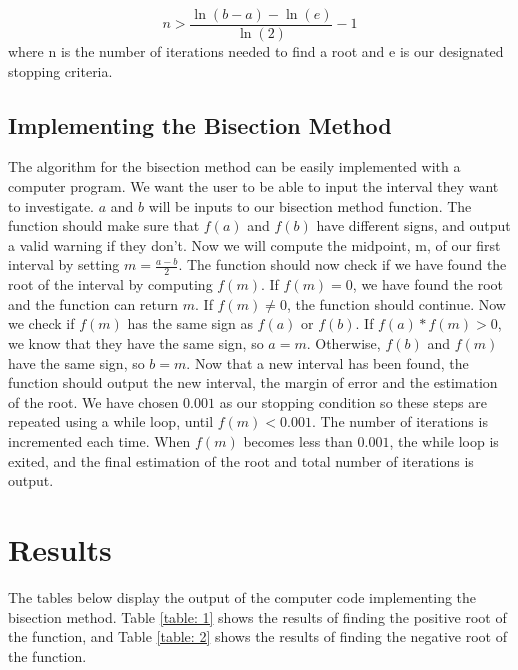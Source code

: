 \documentclass{article}
\begin{document}
\begin{equation*}
    n > \frac{\ln{(b-a)}-\ln{(e)}}{\ln{(2)}}-1
\end{equation*}
where n is the number of iterations needed to find a root and e is our designated stopping criteria.

\subsection{Implementing the Bisection Method} 
The algorithm for the bisection method can be easily implemented with a computer program. We want the user to be able to input the interval they want to investigate. $a$ and $b$ will be inputs to our bisection method function. The function should make sure that $f(a)$ and $f(b)$ have different signs, and output a valid warning if they don't. Now we will compute the midpoint, m, of our first interval by setting $m=\frac{a-b}{2}$. The function should now check if we have found the root of the interval by computing $f(m)$. If $f(m)=0$, we have found the root and the function can return $m$. If $f(m)\ne 0$, the function should continue. Now we check if $f(m)$ has the same sign as $f(a)$ or $f(b)$. If $f(a)*f(m)>0$, we know that they have the same sign, so $a=m$. Otherwise, $f(b)$ and $f(m)$ have the same sign, so $b=m$. Now that a new interval has been found, the function should output the new interval, the margin of error and the estimation of the root. We have chosen $0.001$ as our stopping condition so these steps are repeated using a while loop, until $f(m)<0.001$. The number of iterations is incremented each time. When $f(m)$ becomes less than $0.001$, the while loop is exited, and the final estimation of the root and total number of iterations is output.



\section{Results}

The tables below display the output of the computer code implementing the bisection method. Table \ref{table: 1} shows the results of finding the positive root of the function, and Table \ref{table: 2} shows the results of finding the negative root of the function.
\end{document}
